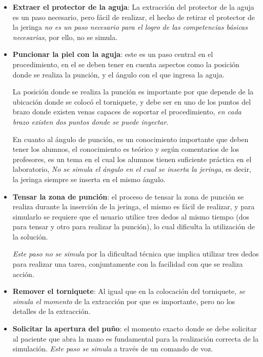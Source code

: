 \begin{itemize}
\item \textbf{Extraer el protector de la aguja}: La extracción del protector de
    la aguja es un paso necesario, pero fácil de realizar, el hecho de retirar
    el protector de la jeringa \emph{no es un paso necesario para el logro de
        las competencias básicas necesarias}, por ello, no se simula.

\item \textbf{Puncionar la piel con la aguja}: este es un paso central en el
    procedimiento, en el se deben tener en cuenta aspectos como la posición
    donde se realiza la punción, y el ángulo con el que ingresa la aguja.

    La posición donde se realiza la punción es importante por que depende de la
    ubicación donde se colocó el torniquete, y debe ser en uno de los puntos del
    brazo donde existen venas capaces de soportar el procedimiento, \emph{en
        cada brazo existen dos puntos donde se puede inyectar}.

    En cuanto al ángulo de punción, es un conocimiento importante que deben
    tener los alumnos, el conocimiento es teórico y según comentarios de los
    profesores, es un tema en el cual los alumnos tienen suficiente práctica en
    el laboratorio, \emph{No se simula el ángulo en el cual se inserta la
        jeringa}, es decir, la jeringa siempre se inserta en el mismo ángulo.

\item \textbf{Tensar la zona de punción}: el proceso de tensar la zona de
    punción se realiza durante la inserción de la jeringa, el mismo es fácil de
    realizar, y para simularlo se requiere que el usuario utilice tres dedos al
    mismo tiempo (dos para tensar y otro para realizar la punción), lo cual
    dificulta la utilización de la solución.

    \emph{Este paso no se simula} por la dificultad técnica que implica utilizar
    tres dedos para realizar una tarea, conjuntamente con la facilidad con que
    se realiza acción. 

\item \textbf{Remover el torniquete}: Al igual que en la colocación del
    torniquete, \emph{se simula el momento} de la extracción por que es
    importante, pero no los detalles de la extracción.

\item \textbf{Solicitar la apertura del puño}: el momento exacto donde se debe
    solicitar al paciente que abra la mano es fundamental para la realización
    correcta de la simulación. \emph{Este paso se simula} a través de un comando
    de voz.


\end{itemize}
